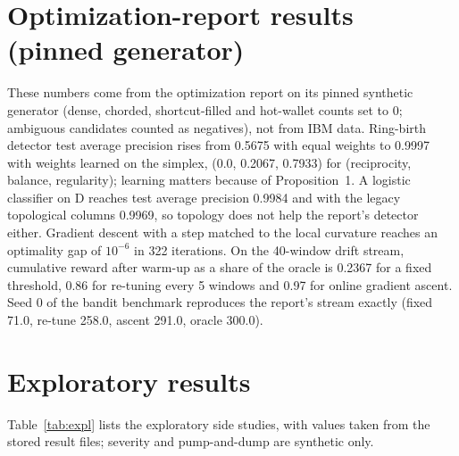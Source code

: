 \documentclass[conference]{IEEEtran}
\begin{document}
\appendices

\section{Optimization-report results (pinned generator)}
\label{app:report}
These numbers come from the optimization report on its pinned synthetic generator (dense, chorded, shortcut-filled and hot-wallet counts set to 0; ambiguous candidates counted as negatives), not from IBM data. Ring-birth detector test average precision rises from 0.5675 with equal weights to 0.9997 with weights learned on the simplex, (0.0, 0.2067, 0.7933) for (reciprocity, balance, regularity); learning matters because of Proposition~1. A logistic classifier on D reaches test average precision 0.9984 and with the legacy topological columns 0.9969, so topology does not help the report's detector either. Gradient descent with a step matched to the local curvature reaches an optimality gap of $10^{-6}$ in 322 iterations. On the 40-window drift stream, cumulative reward after warm-up as a share of the oracle is 0.2367 for a fixed threshold, 0.86 for re-tuning every 5 windows and 0.97 for online gradient ascent. Seed 0 of the bandit benchmark reproduces the report's stream exactly (fixed 71.0, re-tune 258.0, ascent 291.0, oracle 300.0).

\section{Exploratory results}
\label{app:expl}
Table~\ref{tab:expl} lists the exploratory side studies, with values taken from the stored result files; severity and pump-and-dump are synthetic only.
\end{document}

